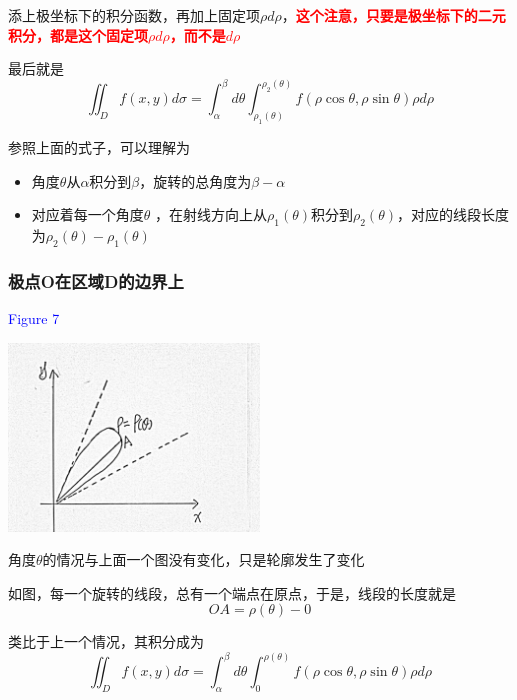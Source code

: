 \documentclass[a4paper]{ctexart}
\begin{document}
\begin{multicols}{2}
\par 添上极坐标下的积分函数，再加上固定项$\rho d \rho$，\textcolor{red}{\textbf{这个注意，只要是极坐标下的二元积分，都是这个固定项$\rho d \rho$，而不是$d\rho$}}
\par 最后就是
\begin{equation}
\iint_{D}{f(x,y)d\sigma} = \int_{\alpha}^{\beta}{d\theta}\int_{\rho_1(\theta)}^{\rho_2(\theta)}{f(\rho\cos{\theta}, \rho\sin{\theta})\rho d\rho}
\end{equation}
\par 参照上面的式子，可以理解为
\begin{itemize}
\item 角度$\theta$从$\alpha$积分到$\beta$，旋转的总角度为$\beta - \alpha$
\item 对应着每一个角度$\theta$ ，在射线方向上从$\rho_1(\theta)$积分到$\rho_2(\theta)$，对应的线段长度为$\rho_2(\theta) - \rho_1(\theta)$
\end{itemize}
\subsubsection{极点O在区域D的边界上}
\textcolor{blue}{Figure 7}
\begin{center}
\includegraphics[height=5cm]{lecture7/Figure7.jpg}
\end{center}
\par 角度$\theta$的情况与上面一个图没有变化，只是轮廓发生了变化
\par 如图，每一个旋转的线段，总有一个端点在原点，于是，线段的长度就是
\begin{equation}
OA = \rho(\theta) - 0
\end{equation}
\par 类比于上一个情况，其积分成为
\begin{equation}
\iint_{D}{f(x,y)d\sigma} = \int_{\alpha}^{\beta}{d\theta}\int_{0}^{\rho(\theta)}{f(\rho\cos{\theta}, \rho\sin{\theta})\rho d\rho}
\end{equation}


\end{multicols}
\end{document}
